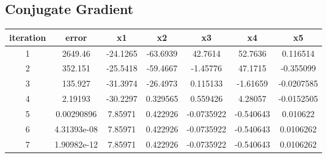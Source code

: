 \documentclass[12pt]{article}
\begin{document}
\subsection{Conjugate Gradient}
\begin{center}
    \begin{tabular}{|c|c|c|c|c|c|c|}
        \hline
        iteration & error & x1 & x2 & x3 & x4 & x5 \\
        \hline
        1 & 2649.46 & -24.1265 & -63.6939 & 42.7614 & 52.7636 & 0.116514 \\
        \hline
        2 & 352.151 & -25.5418 & -59.4667 & -1.45776 & 47.1715 & -0.355099 \\
        \hline 
        3 & 135.927 & -31.3974 & -26.4973 & 0.115133 & -1.61659 & -0.0207585 \\
        \hline
        4 & 2.19193 & -30.2297 & 0.329565 & 0.559426 & 4.28057 & -0.0152505 \\
        \hline
        5 & 0.00290896 & 7.85971 & 0.422926 & -0.0735922 & -0.540643 & 0.010622 \\
        \hline
        6 & 4.31393e-08 & 7.85971 & 0.422926 & -0.0735922 & -0.540643 & 0.0106262 \\
        \hline
        7 & 1.90982e-12 & 7.85971 & 0.422926 & -0.0735922 & -0.540643 & 0.0106262 \\
        \hline
    \end{tabular}
\end{center}
\end{document}
